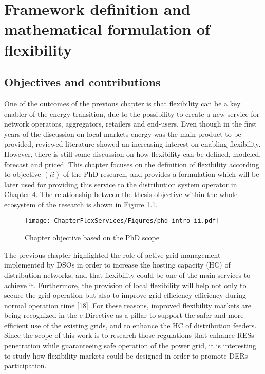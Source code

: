 \chapter{Framework definition and mathematical formulation of flexibility}
\label{chapterFlexibility}

\section{Objectives and contributions}
One of the outcomes of the previous chapter is that flexibility can be a key enabler of the energy transition, due to the possibility to create a new service for network operators, aggregators, retailers and end-users. Even though in the first years of the discussion on local markets energy was the main product to be provided, reviewed literature showed an increasing interest on enabling flexibility. However, there is still some discussion on how flexibility can be defined, modeled, forecast and priced. This chapter focuses on the definition of flexibility according to objective $(ii)$ of the PhD research, and provides a formulation which will be later used for providing this service to the distribution system operator in Chapter 4. The relationship between the thesis objective within the whole ecosystem of the research is shown in Figure \ref{fig:chapter_obj_ii}.


\begin{figure}[htbp]
	\centering
	\texttt{[image: ChapterFlexServices/Figures/phd\_intro\_ii.pdf]}
		\caption{Chapter objective based on the PhD scope}
	\label{fig:chapter_obj_ii}  
\end{figure}

The previous chapter highlighted the role of active grid management implemented by DSOs in order to increase the hosting capacity (HC) of distribution networks, and that flexibility could be one of the main services to achieve it. Furthermore, the provision of local flexibility will help not only to secure the grid operation but also to improve grid efficiency efficiency during normal operation time [18]. For these reasons, improved flexibility markets are being recognized in the e-Directive as a pillar to support the safer and more efficient use of the existing grids, and to enhance the HC of distribution feeders. Since the scope of this work is to research those regulations that enhance RESs penetration while guaranteeing safe operation of the power grid, it is interesting to study how flexibility markets could be designed in order to promote DERs participation.


